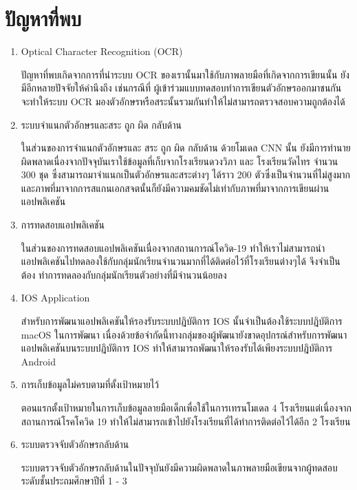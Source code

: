 \documentclass[12pt,oneside,openright,a4paper]{cpe-thai-project}
\begin{document}
\section{ปัญหาที่พบ}
\begin{enumerate}
  \item Optical Character Recognition (OCR)\par
        ปัญหาที่พบเกิดจากการที่นำระบบ OCR ของเรานั้นมาใช้กับภาพลายมือที่เกิดจากการเขียนนั้น ยังมีอีกหลายปัจจัยให้คำนึงถึง เช่นกรณีที่ ผู้เข้าร่วมแบบทดสอบทำการเขียนตัวอักษรออกมาชนกัน
        จะทำให้ระบบ OCR มองตัวอักษรหรือสระนั้นรวมกันทำให้ไม่สามารถตรวจสอบความถูกต้องได้
  \item ระบบจำแนกตัวอักษรและสระ ถูก ผิด กลับด้าน\par
        ในส่วนของการจำแนกตัวอักษรและ สระ ถูก ผิด กลับด้าน ด้วยโมเดล CNN นั้น ยังมีการทำนายผิดพลาดเนื่องจากปัจจุบันเราใช้ข้อมูลที่เก็บจากโรงเรียนดวงวิภา และ โรงเรียนวัดไทร จำนวน 300 ชุด
        ซึ่งสามารถมาจำแนกเป็นตัวอักษรและสระต่างๆ ได้ราว 200 ตัวซึ่งเป็นจำนวนที่ไม่สูงมากและภาพที่มาจากการสแกนเอกสจตนั้นก็ยังมีความคมชัดไม่เท่ากับภาพที่มาจากการเขียนผ่านแอปพลิเคชัน
  \item การทดสอบแอปพลิเคชัน\par
        ในส่วนของการทดสอบแอปพลิเคชันเนื่องจากสถานการณ์โควิด-19 ทำให้เราไม่สามารถนำแอปพลิเคชันไปทดลองใช้กับกลุ่มนักเรียนจำนวนมากที่ได้ติดต่อไว้ที่โรงเรียนต่างๆได้ จึงจำเป็นต้อง
        ทำการทดลองกับกลุ่มนักเรียนตัวอย่างที่มีจำนวนน้อยลง  
  \item IOS Application\par
  สำหรับการพัฒนาแอปพลิเคชันให้รองรับระบบปฎิบัติการ IOS  นั้นจำเป็นต้องใช้ระบบปฎิบัติการ macOS ในการพัฒนา เนื่องด้วยข้อจำกัดนี้ทางกลุ่มของผู้พัฒนายังขาดอุปกรณ์สำหรับการพัฒนาแอปพลิเคชันบนระบบปฎิบัติการ IOS ทำให้สามารถพัฒนาให้รองรับได้เพียงระบบปฎิบัติการ Android
  \item การเก็บข้อมูลไม่ครบตามที่ตั้งเป้าหมายไว้\par
  ตอนแรกตั้งเป้าหมายในการเก็บข้อมูลลายมือเด็กเพื่อใช้ในการเทรนโมเดล 4 โรงเรียนแต่เนื่องจากสถานการณ์โรคโควิด 19 ทำให้ไม่สามารถเข้าไปยังโรงเรียนที่ได้ทำการติดต่อไว้ได้อีก 2 โรงเรียน
  \item ระบบตรวจจับตัวอักษรกลับด้าน\par
  ระบบตรวจจับตัวอักษรกลับด้านในปัจจุบันยังมีความผิดพลาดในภาพลายมือเขียนจากผู้ทดสอบระดับชั้นประถมศึกษาปีที่ 1 - 3 
\end{enumerate}
\end{document}
